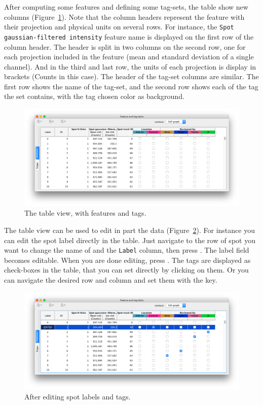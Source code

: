 After computing some features and defining some tag-sets, the table show new columns (Fi\-gu\-re~\ref{fig:TableViewFeatureTags}). 
Note that the column headers represent the feature with their projection and physical units on several rows.
For instance, the \texttt{Spot gaussian-filtered intensity} feature name is displayed on the first row of the column header.
The header is split in two columns on the second row, one for each projection included in the feature (mean and standard deviation of a single channel).
And in the third and last row, the units of each projection is display in brackets (Counts in this case).
The header of the tag-set columns are similar.
The first row shows the name of the tag-set, and the second row shows each of the tag the set contains, with the tag chosen color as background.

\begin{figure}
    \centering
    \includegraphics[height=0.27\textheight]{figures/Mastodon_TableView3.png}
    
    \caption{The table view, with features and tags.  }
    \label{fig:TableViewFeatureTags}
\end{figure}

The table view can be used to edit in part the data  (Fi\-gu\-re~\ref{fig:TableViewEditing}). 
For instance you can edit the spot label directly in the table. 
Just navigate to the row of spot you want to change the name of and the \texttt{Label} column, then press .
The label field becomes editable.
When you are done editing, press \keys{\return}.
The tags are displayed as check-boxes in the table, that you can set directly by clicking on them.
Or you can navigate the desired row and column and set them with the  key.

\begin{figure}
    \centering
    \includegraphics[height=0.27\textheight]{figures/Mastodon_TableView4.png}
    
    \caption{After editing spot labels and tags.  }
    \label{fig:TableViewEditing}
\end{figure}

